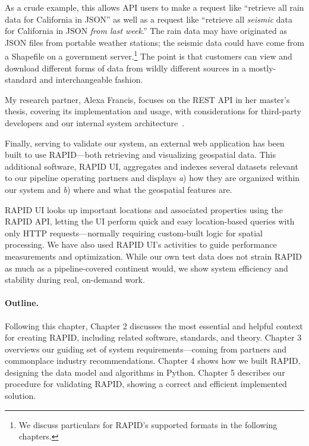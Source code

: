 As a crude example, this allows API users to make a request like ``retrieve all rain data for California in JSON'' as well as a request like ``retrieve all \textit{seismic} data for California in JSON \textit{from last week}.'' The rain data may have originated as JSON files from portable weather stations; the seismic data could have come from a Shapefile on a government server.\footnote{We discuss particulars for RAPID's supported formats in the following chapters.} The point is that customers can view and download different forms of data from wildly different sources in a mostly-standard and interchangeable fashion.

My research partner, Alexa Francis, focuses on the REST API in her master's thesis, covering its implementation and usage, with considerations for third-party developers and our internal system architecture~\cite{Francis}.

\label{polyview_intro}
Finally, serving to validate our system, an external web application has been built to use RAPID---both retrieving and visualizing geospatial data. This additional software, RAPID UI, aggregates and indexes several datasets relevant to our pipeline operating partners and displays \textit{a}) how they are organized within our system and \textit{b}) where and what the geospatial features are.

RAPID UI looks up important locations and associated properties using the RAPID API, letting the UI perform quick and easy location-based queries with only HTTP requests---normally requiring custom-built logic for spatial processing. We have also used RAPID UI's activities to guide performance measurements and optimization. While our own test data does not strain RAPID as much as a pipeline-covered continent would, we show system efficiency and stability during real, on-demand work.

\paragraph{Outline.}
Following this chapter, Chapter 2 discusses the most essential and helpful context for creating RAPID, including related software, standards, and theory. Chapter 3 overviews our guiding set of system requirements---coming from partners and commonplace industry recommendations. Chapter 4 shows how we built RAPID, designing the data model and algorithms in Python. Chapter 5 describes our procedure for validating RAPID, showing a correct and efficient implemented solution.


